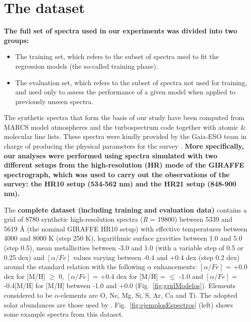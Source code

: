 \documentclass[a4paper,fleqn,usenatbib]{mnras}
\begin{document}
\section{The dataset}
\label{sec:dataset}

{\bf The full set of spectra used in our experiments was divided into two groups:
\begin{itemize}
\item The training set, which refers to the subset of spectra used to 
	fit the regression models (the so-called training phase).
\item The evaluation set, which refers to the subset of spectra not used for training, and
	used only to assess the performance of a given model when applied to previously unseen spectra.
\end{itemize}
}

The synthetic spectra that form the basis of our study have been
computed from MARCS model atmospheres \citep{gustafsson:08} and the
turbospectrum code \citep{alvarez:98, plez:12} together with atomic \&
molecular line lists. These spectra were kindly provided by the
Gaia-ESO team in charge of producing the physical parameters for the
survey \citep[see][for further details]{2012A&A...544A.126D}.
{\bf More specifically, our analyses were performed using spectra 
simulated with two different setups from the high-resolution (HR) 
mode of the GIRAFFE spectrograph, which was used to carry out the 
observations of the survey: the HR10 setup (534-562 nm) and the HR21 
setup (848-900 nm).}

The {\bf complete dataset (including training and evaluation data)} 
contains a grid of 8780 synthetic high-resolution spectra 
(\textit{R} = 19800) between 5339 and 5619 {\AA} (the nominal GIRAFFE 
HR10 setup) with effective temperatures between 4000 and 
8000 K (step 250 K), logarithmic surface gravities between 1.0 and 5.0 
(step 0.5), mean metallicities between -3.0 and 1.0 (with a variable step 
of 0.5 or 0.25 dex) and $\left[ \alpha/Fe \right]$ values varying between
-0.4 and +0.4 dex (step 0.2 dex) around the standard relation with the
following $\alpha$ enhancements: $\left[ \alpha/Fe \right]$ = +0.0 dex
for [M/H] $\geqslant$ 0, $\left[ \alpha/Fe \right]$ = +0.4 dex for
[M/H] = $\leqslant$ -1.0 and $\left[ \alpha/Fe \right]$ = -0.4[M/H]
for [M/H] between -1.0 and +0.0 (Fig.~\ref{fig:gridModelos}).
Elements considered to be $\alpha$-elements are O, Ne, Mg, Si, S, Ar,
Ca and Ti. The adopted solar abundances are those used by
\citep{gustafsson:08}. Fig.~\ref{fig:ejemplosEspectros} (left) shows some
example spectra from this dataset.   
\end{document}
